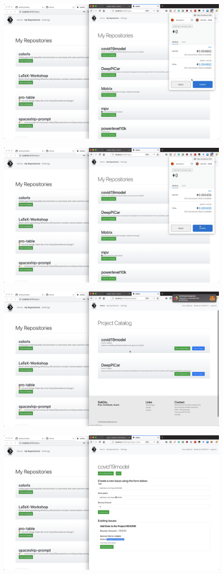 \documentclass[12pt]{article}
\renewcommand{\_}{\kern-1.5pt\textunderscore\kern-1.5pt}
\begin{document}
\begin{enumerate}
	      \includegraphics[height=7cm]{graphs/23. alice_post_to_catalog_1}

	      \includegraphics[height=7cm]{graphs/24. alice_post_to_catalog_2}

	      \includegraphics[height=7cm]{graphs/25. added_project_catalog}

	      \includegraphics[height=7cm]{graphs/26. alice_create_issue1}


\end{enumerate}
\end{document}
